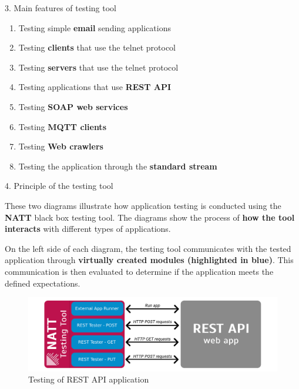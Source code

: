 \documentclass[final]{beamer}
\newlength{\colwidth}
\begin{document}
\begin{frame}[t]
\begin{columns}[t]
\begin{column}{\colwidth}
\begin{alertblock}{3. Main features of testing tool}
    \begin{enumerate}
      \item Testing simple \textbf{email} sending applications
      \item Testing \textbf{clients} that use the telnet protocol
      \item Testing \textbf{servers} that use the telnet protocol
      \item Testing applications that use \textbf{REST API}
      \item Testing \textbf{SOAP web services}
      \item Testing \textbf{MQTT clients}
      \item Testing \textbf{Web crawlers}
      \item Testing the application through the \textbf{standard stream}
    \end{enumerate}

  \end{alertblock}

  \begin{block}{4. Principle of the testing tool}

    These two diagrams illustrate how application testing is conducted using the \textbf{NATT}
    black box testing tool. The diagrams show the process of \textbf{how the tool interacts} 
    with different types of applications. 

    \hspace{2em} On the left side of each diagram, the testing tool communicates with 
    the tested application through \textbf{virtually created modules (highlighted in blue)}. This 
    communication is then evaluated to determine if the application meets the defined
    expectations.

    \begin{figure}
      \centering
        \includegraphics[width=1.0\textwidth]{./imgs/rest-diagram.png}
      \caption{Testing of REST API application}
    \end{figure}


\end{block}
\end{column}
\end{columns}
\end{frame}
\end{document}
